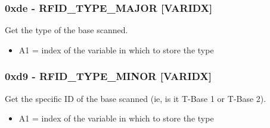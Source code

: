 \documentclass[12pt,a4paper]{scrbook}
\begin{document}
\subsubsection{0xde - RFID\_TYPE\_MAJOR [VARIDX]}
Get the type of the base scanned.
\begin{itemize}
\item A1 = index of the variable in which to store the type
\end{itemize}

\subsubsection{0xd9 - RFID\_TYPE\_MINOR [VARIDX]}
Get the specific ID of the base scanned (ie, is it T-Base 1 or T-Base 2).
\begin{itemize}
\item A1 = index of the variable in which to store the type
\end{itemize}
\end{document}
